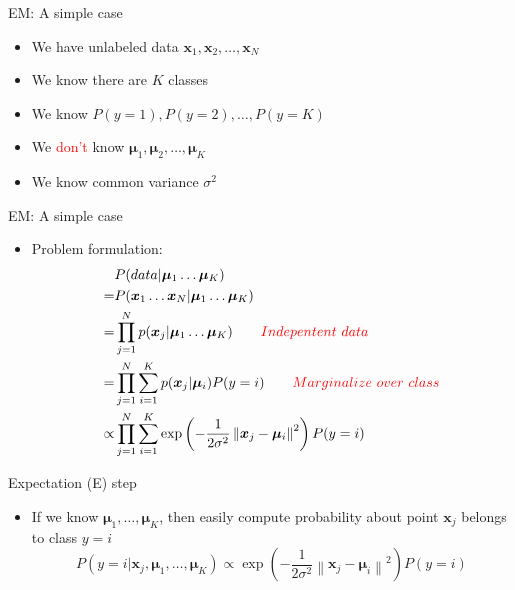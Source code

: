 \documentclass[12pt]{beamer}
\newcommand{\norm}[1]{\left\lVert#1\right\rVert}
\begin{document}
\begin{frame}{EM: A simple case}
\begin{itemize}
	\item We have unlabeled data $\bm{x}_1, \bm{x}_2, \ldots, \bm{x}_N$
	\item We know there are $K$ classes
	\item We know $P(y=1), P(y=2),\ldots,P(y=K)$
	\item We \textcolor{red}{don't} know $\bm{\mu}_1,\bm{\mu}_2,\ldots,\bm{\mu}_K$
	\item We know common variance $\sigma^2$
\end{itemize}
\end{frame}

\begin{frame}{EM: A simple case}
\begin{itemize}
	\item Problem formulation:
	\begin{equation} \nonumber
	\begin{aligned}
	&P(data|\bm{\mu}_1\ldots\bm{\mu}_K)\\
	=&P(\bm{x}_1\ldots\bm{x}_N|\bm{\mu}_1\ldots\bm{\mu}_K) \\
	=&\prod_{j=1}^{N}p(\bm{x}_j|\bm{\mu}_1\ldots\bm{\mu}_K) \qquad \textcolor{red}{Indepentent~data} \\
	=&\prod_{j=1}^{N}\sum_{i=1}^{K}p(\bm{x}_j|\bm{\mu}_i)P(y=i) \qquad \textcolor{red}{Marginalize~over~class} \\
	\propto&\prod_{j=1}^{N}\sum_{i=1}^{K}\exp\left( -\frac{1}{2\sigma^2}\norm{\bm{x}_j-\bm{\mu}_i}^2 \right)P(y=i)
	\end{aligned}
	\end{equation}
\end{itemize}
\end{frame}

\begin{frame}{Expectation (E) step}
\begin{itemize}
	\item If we know $\bm{\mu}_1,\ldots,\bm{\mu}_K$, then easily compute probability about point $\bm{x}_j$ belongs to class $y=i$
	\begin{equation} \nonumber
	P(y=i|\bm{x}_j,\bm{\mu}_1,\ldots,\bm{\mu}_K)\propto \exp\left( -\frac{1}{2\sigma^2}\norm{\bm{x}_j-\bm{\mu}_i}^2 \right)P(y=i)
	\end{equation}
\end{itemize}
\end{frame}
\end{document}
